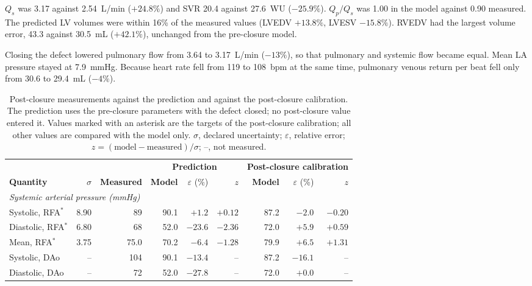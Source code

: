 $Q_s$ was 3.17 against 2.54~L/min ($+24.8\%$) and SVR 20.4 against 27.6~WU ($-25.9\%$). $Q_p/Q_s$ was 1.00 in the model against 0.90 measured. The predicted LV volumes were within 16\% of the measured values (LVEDV $+13.8\%$, LVESV $-15.8\%$). RVEDV had the largest volume error, 43.3 against 30.5~mL ($+42.1\%$), unchanged from the pre-closure model.

Closing the defect lowered pulmonary flow from 3.64 to 3.17~L/min ($-13\%$), so that pulmonary and systemic flow became equal. Mean LA pressure stayed at 7.9~mmHg. Because heart rate fell from 119 to 108~bpm at the same time, pulmonary venous return per beat fell only from 30.6 to 29.4~mL ($-4\%$).

\begin{table}[!htbp]
\centering\small
\setlength{\tabcolsep}{3.5pt}
\caption{Post-closure measurements against the prediction and against the post-closure calibration. The prediction uses the pre-closure parameters with the defect closed; no post-closure value entered it. Values marked with an asterisk are the targets of the post-closure calibration; all other values are compared with the model only. $\sigma$, declared uncertainty; $\varepsilon$, relative error; $z = (\text{model}-\text{measured})/\sigma$; --, not measured.}
\label{tab:post}\label{tab:post_calib}
\begin{tabular}{lrrrrrrrr}
\toprule
 & & & \multicolumn{3}{c}{\textbf{Prediction}} & \multicolumn{3}{c}{\textbf{Post-closure calibration}} \\
\cmidrule(lr){4-6}\cmidrule(lr){7-9}
\textbf{Quantity} & $\sigma$ & \textbf{Measured} & \textbf{Model} & $\varepsilon$ (\%) & $z$ & \textbf{Model} & $\varepsilon$ (\%) & $z$ \\
\midrule
\multicolumn{9}{l}{\emph{Systemic arterial pressure (mmHg)}} \\
Systolic, RFA$^{*}$ & 8.90 & 89 & 90.1 & $+1.2$ & $+0.12$ & 87.2 & $-2.0$ & $-0.20$ \\
Diastolic, RFA$^{*}$ & 6.80 & 68 & 52.0 & $-23.6$ & $-2.36$ & 72.0 & $+5.9$ & $+0.59$ \\
Mean, RFA$^{*}$ & 3.75 & 75.0 & 70.2 & $-6.4$ & $-1.28$ & 79.9 & $+6.5$ & $+1.31$ \\
Systolic, DAo & -- & 104 & 90.1 & $-13.4$ & -- & 87.2 & $-16.1$ & -- \\
Diastolic, DAo & -- & 72 & 52.0 & $-27.8$ & -- & 72.0 & $+0.0$ & -- \\

\end{tabular}
\end{table}
